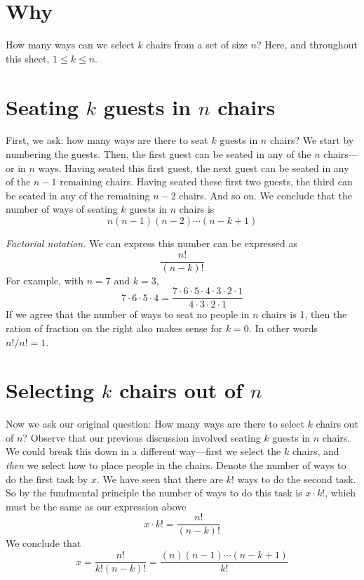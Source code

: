 

\section*{Why}

How many ways can we select $k$ chairs from a set of size $n$?
Here, and throughout this sheet, $1 \leq k \leq n$.

\section*{Seating $k$ guests in $n$ chairs}

First, we ask: how many ways are there to seat $k$ guests in $n$ chairs?
We start by numbering the guests.
Then, the first guest can be seated in any of the $n$ chairs---or in $n$ ways.
Having seated this first guest, the next guest can be seated in any of the $n-1$ remaining chairs.
Having seated these first two guests, the third can be seated in any of the remaining $n -2$ chairs.
And so on.
We conclude that the number of ways of seating $k$ guests in $n$ chairs is
\[
n(n-1)(n-2)\cdots(n-k+1)
\]

\textit{Factorial notation.}
We can express this number can be expressed as
\[
\frac{n!}{(n-k)!}
\]
For example, with $n = 7$ and $k = 3$,
\[
7\cdot 6\cdot 5\cdot 4 = \frac{7\cdot 6\cdot 5\cdot 4\cdot 3\cdot 2\cdot 1}{4\cdot 3\cdot 2\cdot 1}
\]
If we agree that the number of ways to seat no people in $n$ chairs is 1, then the ration of fraction on the right also makes sense for $k = 0$.
In other words $n!/n! = 1$.

\section*{Selecting $k$ chairs out of $n$}

Now we ask our original question: How many ways are there to select $k$ chairs out of $n$?
Observe that our previous discussion involved seating $k$ guests in $n$ chairs.
We could break this down in a different way---first we select the $k$ chairs, and \textit{then} we select how to place people in the chairs.
Denote the number of ways to do the first task by $x$.
We have seen that there are $k!$ ways to do the second task.
So by the fundmental principle the number of ways to do this task is $x\cdot k!$, which must be the same as our expression above
\[
x\cdot k! = \frac{n!}{(n-k)!}
\]
We conclude that
\[
x = \frac{n!}{k!(n-k)!} = \frac{(n)(n-1)\cdots(n-k+1)}{k!}
\]

